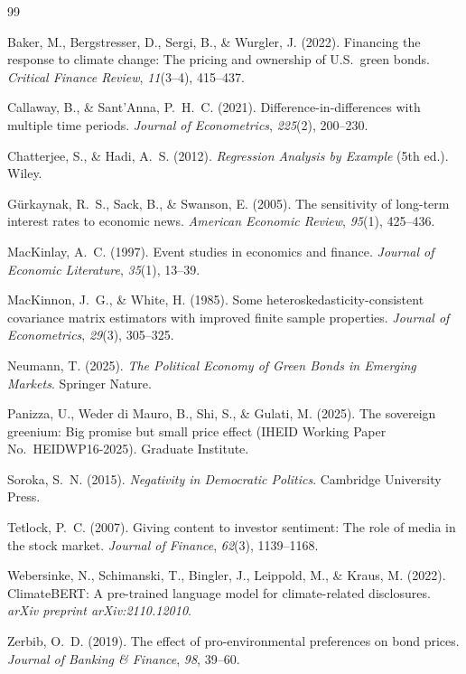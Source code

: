 \documentclass[12pt,a4paper]{article}
\begin{document}
\newpage

\begin{thebibliography}{99}

Baker, M., Bergstresser, D., Sergi, B., \& Wurgler, J. (2022). Financing the response to climate change: The pricing and ownership of U.S.\ green bonds. \textit{Critical Finance Review}, \textit{11}(3--4), 415--437.

Callaway, B., \& Sant'Anna, P.~H.~C. (2021). Difference-in-differences with multiple time periods. \textit{Journal of Econometrics}, \textit{225}(2), 200--230.

Chatterjee, S., \& Hadi, A.~S. (2012). \textit{Regression Analysis by Example} (5th ed.). Wiley.

G\"{u}rkaynak, R.~S., Sack, B., \& Swanson, E. (2005). The sensitivity of long-term interest rates to economic news. \textit{American Economic Review}, \textit{95}(1), 425--436.

MacKinlay, A.~C. (1997). Event studies in economics and finance. \textit{Journal of Economic Literature}, \textit{35}(1), 13--39.

MacKinnon, J.~G., \& White, H. (1985). Some heteroskedasticity-consistent covariance matrix estimators with improved finite sample properties. \textit{Journal of Econometrics}, \textit{29}(3), 305--325.

Neumann, T. (2025). \textit{The Political Economy of Green Bonds in Emerging Markets}. Springer Nature.

Panizza, U., Weder di Mauro, B., Shi, S., \& Gulati, M. (2025). The sovereign greenium: Big promise but small price effect (IHEID Working Paper No.\ HEIDWP16-2025). Graduate Institute.

Soroka, S.~N. (2015). \textit{Negativity in Democratic Politics}. Cambridge University Press.

Tetlock, P.~C. (2007). Giving content to investor sentiment: The role of media in the stock market. \textit{Journal of Finance}, \textit{62}(3), 1139--1168.

Webersinke, N., Schimanski, T., Bingler, J., Leippold, M., \& Kraus, M. (2022). ClimateBERT: A pre-trained language model for climate-related disclosures. \textit{arXiv preprint arXiv:2110.12010}.

Zerbib, O.~D. (2019). The effect of pro-environmental preferences on bond prices. \textit{Journal of Banking \& Finance}, \textit{98}, 39--60.

\end{thebibliography}
\end{document}
